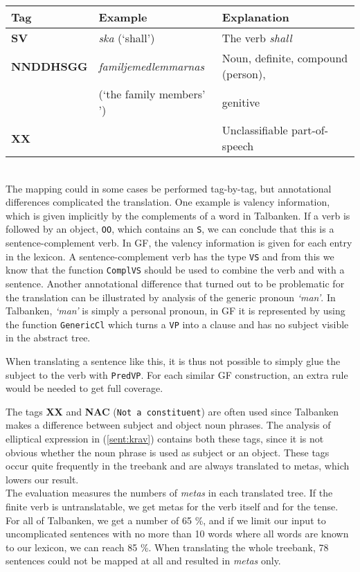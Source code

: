 \documentclass[runningheads,a4paper]{llncs}
\begin{document}
\begin{tabular}{lll}
\textbf{Tag} & \textbf{Example} & \textbf{Explanation} \\
\hline
\textbf{SV} & \emph{ska} (`shall') & The verb \emph{shall}\\
\textbf{NNDDHSGG} & \emph{familjemedlemmarnas} & Noun, definite, compound (person),\\
&(`the family members' ') &genitive \\
\textbf{XX} & & Unclassifiable part-of-speech\\
\end{tabular}\\

The mapping could in some cases be performed tag-by-tag, but annotational
differences complicated the translation.
One example is valency information, which is given implicitly by the complements
of a word in Talbanken. If a verb is followed by an object, \verb-OO-, which contains an
\verb-S-, we can conclude that this is a sentence-complement verb.
In GF, the valency information is given for each entry in the lexicon.
A sentence-complement verb has the type \verb-VS- and from this we know 
that the function \verb-ComplVS- should be used to combine the verb and with a 
sentence.
Another annotational difference that turned out to be problematic for the
translation can be illustrated by analysis of the generic pronoun \emph{`man'}.
In Talbanken, \emph{`man'} is simply a personal pronoun, 
in GF it is represented by using the function \verb|GenericCl| which turns a
\verb-VP- into a clause and has no subject visible in the abstract tree. 

When translating a sentence like this, it is thus not possible to simply glue the
subject to the verb with \verb|PredVP|. For each similar GF construction, an extra rule
would be needed to get full coverage. 

The tags \textbf{XX} and \textbf{NAC} (\verb-Not a constituent-) are often used since Talbanken makes a
difference between subject
and object noun phrases.
The analysis of elliptical expression in (\ref{sent:krav})
\label{sent:krav}
contains both these tags, since it is not obvious
whether the noun phrase is used as subject or an object.
These tags occur quite frequently in the treebank and are always translated
to metas, which lowers our result. \\

The evaluation measures the numbers of \textit{metas} in each translated tree.
If the finite verb is untranslatable, we get metas for the verb itself and for the
tense.
For all of Talbanken, we get a number of 65 \%, and if we limit our input to
uncomplicated sentences with no more than 10 words where all words are known to
our lexicon, we can reach 85 \%. When translating the whole treebank, 78 sentences
could not be mapped at all and resulted in \textit{metas} only.
\end{document}
